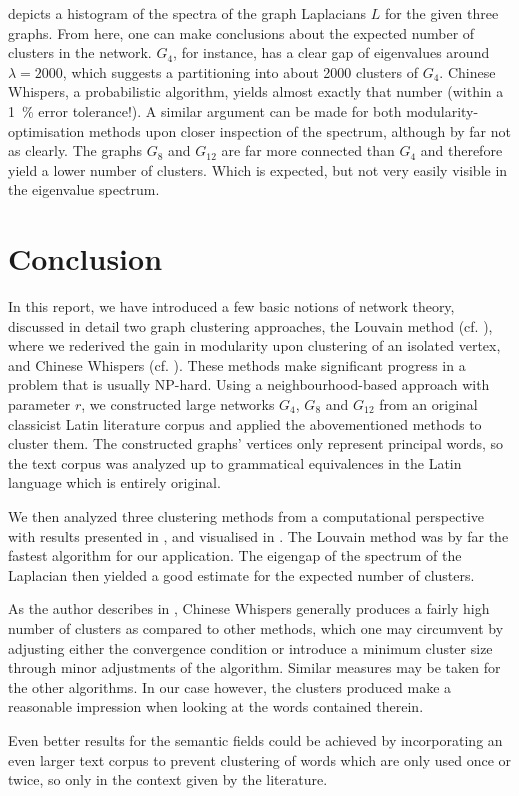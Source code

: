 \documentclass[12pt, a4paper]{article}
\begin{document}
   depicts a histogram of the spectra of the graph Laplacians $L$ for the given three graphs.
  From here, one can make conclusions about the expected number of clusters in the network. $G_4$, for instance, has a clear gap of eigenvalues around $\lambda = 2000$, which suggests a partitioning into about 2000 clusters of $G_4$. Chinese Whispers, a probabilistic algorithm, yields almost exactly that number (within a \SI{1}{\percent} error tolerance!).
  A similar argument can be made for both modularity-optimisation methods upon closer inspection of the spectrum, although by far not as clearly.
  The graphs $G_8$ and $G_{12}$ are far more connected than $G_4$ and therefore yield a lower number of clusters.
  Which is expected, but not very easily visible in the eigenvalue spectrum.

  \pagebreak
  \section{Conclusion}
  In this report, we have introduced a few basic notions of network theory, discussed in detail two graph clustering approaches, the Louvain method (cf. ), where we rederived the gain in modularity upon clustering of an isolated vertex, and Chinese Whispers (cf. ).
  These methods make significant progress in a problem that is usually NP-hard.
  Using a neighbourhood-based approach with parameter $r$, we constructed large networks $G_4$, $G_8$ and $G_{12}$ from an original classicist Latin literature corpus and applied the abovementioned methods to cluster them.
  The constructed graphs' vertices only represent principal words, so the text corpus was analyzed up to grammatical equivalences in the Latin language which is entirely original.

  We then analyzed three clustering methods from a computational perspective with results presented in ,  and visualised in .
  The Louvain method was by far the fastest algorithm for our application.
  The eigengap of the spectrum of the Laplacian then yielded a good estimate for the expected number of clusters.

  As the author describes in \cite{cw-biemann}, Chinese Whispers generally produces a fairly high number of clusters as compared to other methods, which one may circumvent by adjusting either the convergence condition or introduce a minimum cluster size through minor adjustments of the algorithm.
  Similar measures may be taken for the other algorithms.
  In our case however, the clusters produced make a reasonable impression when looking at the words contained therein.

  Even better results for the semantic fields could be achieved by incorporating an even larger text corpus to prevent clustering of words which are only used once or twice, so only in the context given by the literature.

  \pagebreak
  \printbibliography
\end{document}
